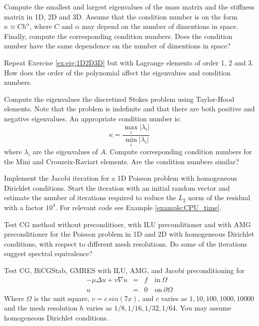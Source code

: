 \begin{exercise}
\label{ex:eig:1D2D3D}
Compute the smallest and largest eigenvalues of the mass matrix and 
the stiffness matrix in 1D, 2D and 3D. Assume that
the condition number is on the form  
$\kappa \approx C h^\alpha$, where $C$ and $\alpha$ may
depend on the number of dimentions in space.   
Finally, compute the corresponding condition numbers.  
Does the condition number have the same dependence on 
the number of dimentions in space?  
\end{exercise}

\begin{exercise}
\label{ex:eig:1D2D3D:order}
Repeat Exercise \ref{ex:eig:1D2D3D} but with Lagrange elements of order 1, 2 and 3.  
How does the order of the polynomial affect the eigenvalues and condition numbers. 
\end{exercise}


\begin{exercise}
Compute the eigenvalues the discretized Stokes problem
using Taylor-Hood elements. Note that the problem
is indefinite and that there are both positive and 
negative eigenvalues. An appropriate condition number
is:   
\[
\kappa = \frac{ \max_i |\lambda_i |}{ \min_i | \lambda_i|}
\]
where $\lambda_i$ are the eigenvalues of $A$. 
Compute corresponding condition numbers for the Mini and Crouzeix-Raviart 
elements. Are the condition numbers similar?  
\end{exercise}

\begin{exercise}
Implement the Jacobi iteration for a 1D Poisson problem with homogeneous
Dirichlet conditions. Start the iteration with an initial random vector and
estimate the number of iterations required to reduce the $L_2$ norm of the  residual
with a factor $10^4$. For relevant code see Example \ref{example:CPU_time}.
\end{exercise}


\begin{exercise}
\label{ex:poisson}
Test CG method without preconditioer, with ILU preconditioner and with AMG preconditioner 
for the Poisson problem in 1D and 2D with homogeneous Dirichlet conditions,  with respect
to different mesh resolutions. Do some of the iterations suggest spectral equivalence?
\end{exercise}

\begin{exercise}
\label{ex:conv}
Test CG, BiCGStab, GMRES with ILU, AMG, and Jacobi preconditioning for 
\begin{eqnarray*}
-\mu\Delta u + v\nabla u   &=& f \quad \textrm{in}\ \Omega\\
u&=& 0 \quad \textrm{on}\ \partial\Omega
\end{eqnarray*}
Where $\Omega$ is the unit square, $v=c\, sin(7 x)$, and $c$ varies as $1, 10, 100, 1000, 10 000$ and
the mesh resolution $h$ varies as $1/8, 1/16, 1/32, 1/64$. You may assume homogeneous Dirichlet conditions.  

\end{exercise}



